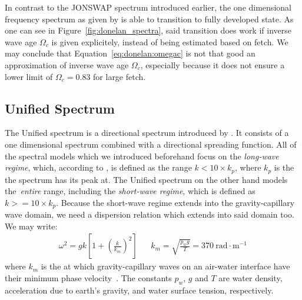 %
In contrast to the JONSWAP spectrum introduced earlier, the one dimensional 
frequency spectrum as given by \citeauthor{article:Donelan1985} is able to
transition to fully developed state. As one can see in
Figure~\ref{fig:donelan_spectra}, said transition does work if inverse wave age
$\Omega_c$ is given explicitely, instead of being estimated based on fetch.
We may conclude that Equation~\ref{eq:donelan:omegac} is not that good an
approximation of inverse wave age $\Omega_c$, especially because it does not
ensure a lower limit of ${\Omega_c=0.83}$ for large fetch.
%
\subsection{Unified Spectrum}
\label{sec:unified_spectrum}
%
The Unified spectrum is a directional \wavenumber spectrum introduced by
\citet{article:Elfouhaily1997}. It consists of a one 
dimensional \wavenumber spectrum combined with a directional spreading 
function. All of the spectral models which we introduced beforehand focus on 
the \emph{long-wave regime}, which, according to \citeauthor{article:Elfouhaily1997},
is defined as the \wavenumber range $k < 10\times k_p$, where $k_p$ is
the \wavenumber the spectrum has its peak at. The Unified spectrum on the
other hand models the~\emph{entire} \wavenumber range, including the
\emph{short-wave regime}, which is defined as $k >= 10\times k_p$.
Because the short-wave regime extends into the gravity-capillary wave domain,
we need a dispersion relation which extends into said domain too.
We may write:
\begin{align*}
\omega^2 = gk\left[1 + \left(\frac{k}{k_m}\right)^2\right] &&
k_m = \sqrt{\frac{p_w g}{T}} = 370~\text{rad}\cdot\text{m}^{-1}
\end{align*}
where $k_m$ is the \wavenumber at which gravity-capillary waves on an air-water
interface have their minimum phase velocity~\citep{lamb:1945}.
The constants $p_w$, $g$ and $T$ are water density, acceleration due to
earth's gravity, and water surface tension, respectively.

